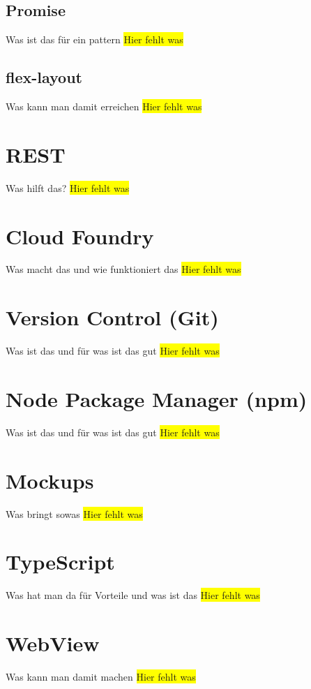 \subsection{Promise}
Was ist das für ein pattern
\colorbox{yellow}{Hier fehlt was}

\subsection{flex-layout}
Was kann man damit erreichen
\colorbox{yellow}{Hier fehlt was}

\section{REST}
Was hilft das?
\colorbox{yellow}{Hier fehlt was}

\section{Cloud Foundry}
Was macht das und wie funktioniert das
\colorbox{yellow}{Hier fehlt was}

\section{Version Control (Git)}
Was ist das und für was ist das gut
\colorbox{yellow}{Hier fehlt was}

\section{Node Package Manager (npm)}
Was ist das und für was ist das gut
\colorbox{yellow}{Hier fehlt was}

\section{Mockups}
Was bringt sowas
\colorbox{yellow}{Hier fehlt was}

\section{TypeScript}
Was hat man da für Vorteile und was ist das
\colorbox{yellow}{Hier fehlt was}

\section{WebView}
Was kann man damit machen
\colorbox{yellow}{Hier fehlt was}